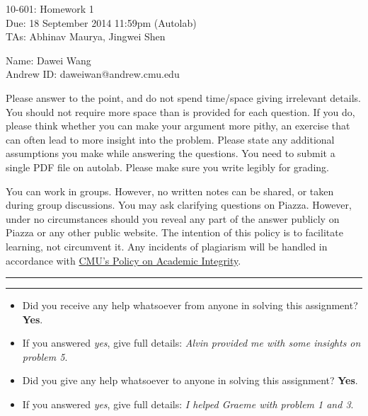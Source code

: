 \documentclass[11pt]{article}
\makeatletter
\newif\ifprint
\newcommand{\mycoursenum}{10-601}
\newcommand{\myhwnum}{1}
\newcommand{\myname}{Dawei Wang}
\newcommand{\myandrew}{daweiwan@andrew.cmu.edu}
\newcommand{\myfirstta}{Abhinav Maurya}
\newcommand{\mysecondta}{Jingwei Shen}
\newcommand{\question}[2] {\vspace{.25in} \hrule\vspace{0.5em} \noindent{\bf #1: #2} \vspace{0.5em} \hrule \vspace{.10in}}
\makeatother
\begin{document}
\medskip

\thispagestyle{plain}
\begin{center}
{\Large \mycoursenum: Homework \myhwnum} \\
Due: 18 September 2014 11:59pm (Autolab) \\
TAs: \myfirstta, \mysecondta \\
\medskip
\ifprint
Name: Dawei Wang \\
Andrew ID: daweiwan \\
\else
Name: \myname \\
Andrew ID: \myandrew \\
\fi
\end{center}

Please answer to the point, and do not spend time/space giving irrelevant details. You should not require more space than is provided for each question. If you do, please think whether you can make your argument more pithy, an exercise that can often lead to more insight into the problem. Please state any additional assumptions you make while answering the questions. You need to submit a single PDF file on autolab. Please make sure you write legibly for grading.

You can work in groups. However, no written notes can be shared, or taken during group discussions. You may ask clarifying questions on Piazza. However, under no circumstances should you reveal any part of the answer publicly on Piazza or any other public website. The intention of this policy is to facilitate learning, not circumvent it. Any incidents of plagiarism will be handled in accordance with \href{http://www.cmu.edu/policies/documents/Academic%20Integrity.htm}{CMU's Policy on Academic Integrity}.


\question{$\star$}{Code of Conduct Declaration}

\begin{itemize}
	\item Did you receive any help whatsoever from anyone in solving this assignment? {\bf Yes}.
	\item If you answered \emph{yes}, give full details: {\it Alvin provided me with some insights on problem 5}. 
	\item Did you give any help whatsoever to anyone in solving this assignment? {\bf Yes}.
	\item If you answered \emph{yes}, give full details: {\it I helped Graeme with problem 1 and 3}.
\end{itemize}
\end{document}
